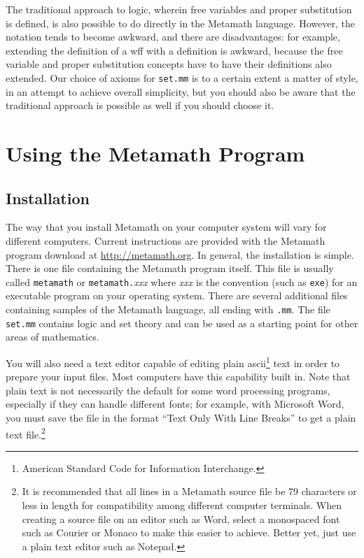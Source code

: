 The traditional approach to logic, wherein free variables and proper
substitution is defined, is also possible to do directly in the Metamath
language.  However, the notation tends to become awkward, and there are
disadvantages:  for example, extending the definition of a wff with a
definition is awkward, because the free variable and proper substitution
concepts have to have their definitions also extended.  Our choice of
axioms for \texttt{set.mm} is to a certain extent a matter of style, in
an attempt to achieve overall simplicity, but you should also be aware
that the traditional approach is possible as well if you should choose
it.

\chapter{Using the Metamath Program}
\label{using}

\section{Installation}

The way that you install Metamath on your
computer system will vary for different computers.  Current
instructions are provided with the Metamath program download at
\url{http://metamath.org}.  In general, the installation is simple.
There is one file containing the Metamath program itself.  This file is
usually called \texttt{metamath} or \texttt{metamath.}{\em xxx} where
{\em xxx} is the convention (such as \texttt{exe}) for an executable
program on your operating system.  There are several additional files
containing samples of the Metamath language, all ending with
\texttt{.mm}.  The file \texttt{set.mm} contains logic and set theory and can be used as a
starting point for other areas of mathematics.

You will also need a text editor capable of editing plain
{\sc ascii}\footnote{American Standard Code for Information Interchange.} text
in order to prepare your input files.  Most computers
have this capability built in.  Note that plain text is not necessarily the
default for some word processing programs, especially if
they can handle different fonts; for example, with Microsoft Word, you must save the file in the format ``Text Only With Line
Breaks'' to get a plain text file.\footnote{It is
recommended that all lines in a Metamath source file be 79 characters or less
in length for compatibility among different computer terminals.  When creating
a source file on an editor such as Word, select a monospaced
font such as Courier or
Monaco to make this easier to achieve.  Better yet,
just use a plain text editor such as Notepad.}

